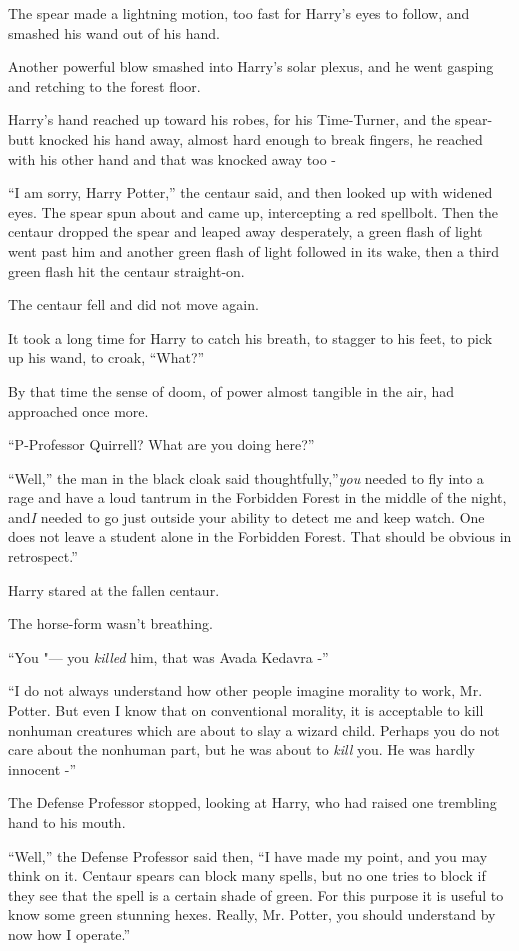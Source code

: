 The spear made a lightning motion, too fast for Harry's eyes to follow,
and smashed his wand out of his hand.

Another powerful blow smashed into Harry's solar plexus, and he went
gasping and retching to the forest floor.

Harry's hand reached up toward his robes, for his Time-Turner, and the
spear-butt knocked his hand away, almost hard enough to break fingers,
he reached with his other hand and that was knocked away too -

``I am sorry, Harry Potter,'' the centaur said, and then looked up with
widened eyes. The spear spun about and came up, intercepting a red
spellbolt. Then the centaur dropped the spear and leaped away
desperately, a green flash of light went past him and another green
flash of light followed in its wake, then a third green flash hit the
centaur straight-on.

The centaur fell and did not move again.

It took a long time for Harry to catch his breath, to stagger to his
feet, to pick up his wand, to croak, ``What?''

By that time the sense of doom, of power almost tangible in the air, had
approached once more.

``P-Professor Quirrell? What are you doing here?''

``Well,'' the man in the black cloak said thoughtfully,''\emph{you}
needed to fly into a rage and have a loud tantrum in the Forbidden
Forest in the middle of the night, and\emph{I} needed to go just outside
your ability to detect me and keep watch. One does not leave a student
alone in the Forbidden Forest. That should be obvious in retrospect.''

Harry stared at the fallen centaur.

The horse-form wasn't breathing.

``You "--- you \emph{killed} him, that was Avada Kedavra -''

``I do not always understand how other people imagine morality to work,
Mr. Potter. But even I know that on conventional morality, it is
acceptable to kill nonhuman creatures which are about to slay a wizard
child. Perhaps you do not care about the nonhuman part, but he was about
to \emph{kill} you. He was hardly innocent -''

The Defense Professor stopped, looking at Harry, who had raised one
trembling hand to his mouth.

``Well,'' the Defense Professor said then, ``I have made my point, and
you may think on it. Centaur spears can block many spells, but no one
tries to block if they see that the spell is a certain shade of green.
For this purpose it is useful to know some green stunning hexes. Really,
Mr. Potter, you should understand by now how I operate.''

